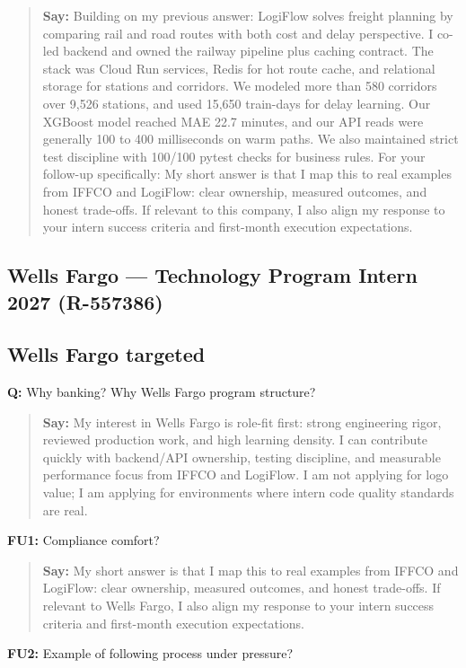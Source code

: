 \documentclass[9pt,a4paper]{article}
\begin{document}
\begin{quote}\small\textbf{Say:} Building on my previous answer: LogiFlow solves freight planning by comparing rail and road routes with both cost and delay perspective. I co-led backend and owned the railway pipeline plus caching contract. The stack was Cloud Run services, Redis for hot route cache, and relational storage for stations and corridors. We modeled more than 580 corridors over 9,526 stations, and used 15,650 train-days for delay learning. Our XGBoost model reached MAE 22.7 minutes, and our API reads were generally 100 to 400 milliseconds on warm paths. We also maintained strict test discipline with 100/100 pytest checks for business rules. For your follow-up specifically: My short answer is that I map this to real examples from IFFCO and LogiFlow: clear ownership, measured outcomes, and honest trade-offs. If relevant to this company, I also align my response to your intern success criteria and first-month execution expectations.\end{quote}
\vspace{2mm}
\newpage
\subsection{Wells Fargo --- Technology Program Intern 2027 (R-557386)}
\subsection{Wells Fargo targeted}
\textbf{Q:} Why banking? Why Wells Fargo program structure?

\begin{quote}\small\textbf{Say:} My interest in Wells Fargo is role-fit first: strong engineering rigor, reviewed production work, and high learning density. I can contribute quickly with backend/API ownership, testing discipline, and measurable performance focus from IFFCO and LogiFlow. I am not applying for logo value; I am applying for environments where intern code quality standards are real.\end{quote}
\vspace{2mm}
\textbf{FU1:} Compliance comfort?

\begin{quote}\small\textbf{Say:} My short answer is that I map this to real examples from IFFCO and LogiFlow: clear ownership, measured outcomes, and honest trade-offs. If relevant to Wells Fargo, I also align my response to your intern success criteria and first-month execution expectations.\end{quote}
\vspace{2mm}
\textbf{FU2:} Example of following process under pressure?
\end{document}
